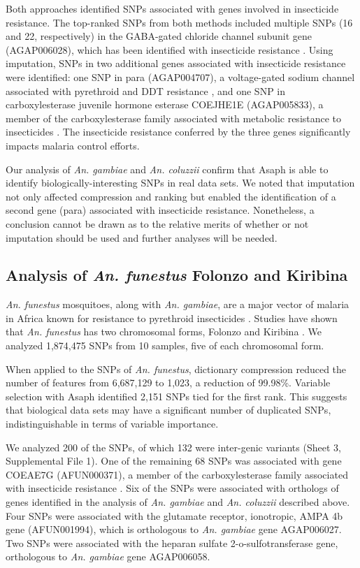 Both approaches identified SNPs associated with genes involved in insecticide resistance.  The top-ranked SNPs from both methods included multiple SNPs (16 and 22, respectively) in the GABA-gated chloride channel subunit gene (AGAP006028), which has been identified with insecticide resistance \cite{Du2005,Buckingham2005,Lawniczak2010}. Using imputation, SNPs in two additional genes associated with insecticide resistance were identified: one SNP in para (AGAP004707), a voltage-gated sodium channel associated with pyrethroid and DDT resistance \cite{Martinez-Torres1998,Ranson2000,Brengues2003}, and one SNP in carboxylesterase juvenile hormone esterase COEJHE1E (AGAP005833), a member of the carboxylesterase family associated with metabolic resistance to insecticides \cite{Ranson2002}. The insecticide resistance conferred by the three genes significantly impacts malaria control efforts.

Our analysis of \emph{An. gambiae} and \emph{An. coluzzii} confirm that Asaph is able to identify biologically-interesting SNPs in real data sets.  We noted that imputation not only affected compression and ranking but enabled the identification of a second gene (para) associated with insecticide resistance.  Nonetheless, a conclusion cannot be drawn as to the relative merits of whether or not imputation should be used and further analyses will be needed.

\subsection{Analysis of \emph{An. funestus} Folonzo and Kiribina}
\emph{An. funestus} mosquitoes, along with \emph{An. gambiae}, are a major vector of malaria in Africa \cite{Coetzee2004} known for resistance to pyrethroid insecticides \cite{Hargreaves2000}. Studies have shown that \emph{An. funestus} has two chromosomal forms, Folonzo and Kiribina \cite{Michel2005,Cohuet2005,Michel2006,Wondji2007}.  We analyzed 1,874,475 SNPs from 10 samples, five of each chromosomal form.

When applied to the SNPs of \emph{An. funestus}, dictionary compression reduced the number of features from 6,687,129 to 1,023, a reduction of 99.98\%.  Variable selection with Asaph identified 2,151 SNPs tied for the first rank.  This suggests that biological data sets may have a significant number of duplicated SNPs, indistinguishable in terms of variable importance.  

We analyzed 200 of the SNPs, of which 132 were inter-genic variants (Sheet 3, Supplemental File 1).  One of the remaining 68 SNPs was associated with gene COEAE7G (AFUN000371), a member of the carboxylesterase family associated with insecticide resistance \cite{Ranson2002}.  Six of the SNPs were associated with orthologs of genes identified in the analysis of \emph{An. gambiae} and \emph{An. coluzzii} described above.  Four SNPs were associated with the glutamate receptor, ionotropic, AMPA 4b gene (AFUN001994), which is orthologous to \emph{An. gambiae} gene AGAP006027. Two SNPs were associated with the heparan sulfate 2-o-sulfotransferase gene, orthologous to \emph{An. gambiae} gene AGAP006058.

